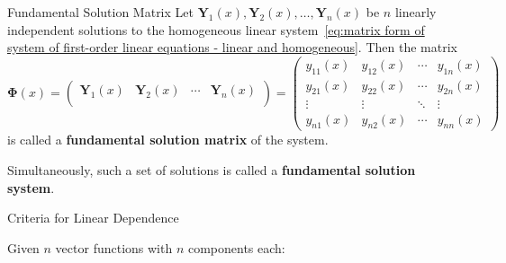 \documentclass[11pt]{../../TexTemplate/elegantbook}
\begin{document}
\begin{definition}{Fundamental Solution Matrix}
    Let \(\mathbf{Y}_{1}(x), \mathbf{Y}_{2}(x), \ldots, \mathbf{Y}_{n}(x)\) be \(n\) linearly independent solutions to 
    the homogeneous linear system~\eqref{eq:matrix form of system of first-order linear equations - linear and homogeneous}.
    Then the matrix
    \[
    \mathbf{\Phi}(x) = 
    \begin{pmatrix}
        \mathbf{Y}_{1}(x) & \mathbf{Y}_{2}(x) & \cdots & \mathbf{Y}_{n}(x) \\
    \end{pmatrix}
    = 
    \begin{pmatrix}
        y_{11}(x) & y_{12}(x) & \cdots & y_{1n}(x) \\
        y_{21}(x) & y_{22}(x) & \cdots & y_{2n}(x) \\
        \vdots & \vdots & \ddots & \vdots \\
        y_{n1}(x) & y_{n2}(x) & \cdots & y_{nn}(x)
    \end{pmatrix}
    \]
    is called a \textbf{fundamental solution matrix} of the system.

    Simultaneously, such a set of solutions is called a \textbf{fundamental solution system}.
\end{definition}

\begin{leftbarTitle}{Criteria for Linear Dependence}\end{leftbarTitle}
Given \(n\) vector functions with \(n\) components each:
\end{document}
